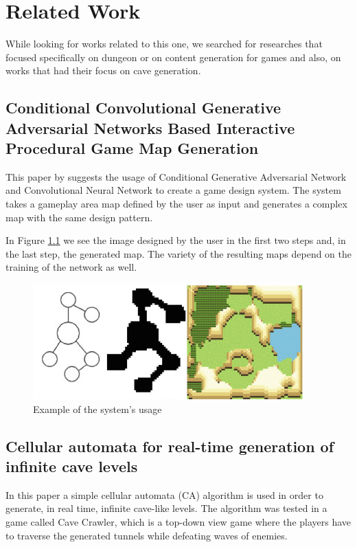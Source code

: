 \chapter{Related Work}
\label{chapter:related}

While looking for works related to this one, we searched for researches that focused specifically on dungeon or on content generation for games and also, on works that had their focus on cave generation.

\section{Conditional Convolutional Generative
Adversarial Networks Based Interactive
Procedural Game Map Generation}

This paper by \textcite{ping:2020} suggests the usage of Conditional Generative Adversarial Network and Convolutional Neural Network to create a game design system. The system takes a gameplay area map defined by the user as input and generates a complex map with the same design pattern.

In Figure \ref{fig:ping} we see the image designed by the user in the first two steps and, in the last step, the generated map. The variety of the resulting maps depend on the training of the network as well.

\begin{figure}[h]
    \caption{Example of the system's usage}
    \centerline{\includegraphics{images/related_work/ping.png}}
    \label{fig:ping}
\end{figure}


\section{Cellular automata for real-time generation
of infinite cave levels}

In this paper a simple cellular automata (CA) algorithm is used in order to generate, in real time, infinite cave-like levels. The algorithm was tested in a game called Cave Crawler, which is a top-down view game where the players have to traverse the generated tunnels while defeating waves of enemies. 

